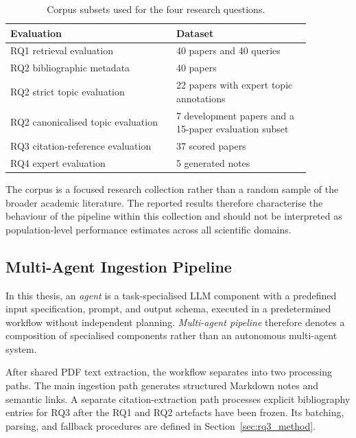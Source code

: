 \documentclass[runningheads]{llncs}
\begin{document}
\begin{table}[htbp]
    \centering
    \caption{Corpus subsets used for the four research questions.}
    \label{tab:evaluation_subsets}
    \begin{tabular}{p{0.48\linewidth} p{0.39\linewidth}}
        \toprule
        \textbf{Evaluation} & \textbf{Dataset} \\
        \midrule

        RQ1 retrieval evaluation
        & 40 papers and 40 queries \\

        RQ2 bibliographic metadata
        & 40 papers \\

        RQ2 strict topic evaluation
        & 22 papers with expert topic annotations \\

        RQ2 canonicalised topic evaluation
        & 7 development papers and a 15-paper evaluation subset \\

        RQ3 citation-reference evaluation
        & 37 scored papers \\

        RQ4 expert evaluation
        & 5 generated notes \\

        \bottomrule
    \end{tabular}
\end{table}

The corpus is a focused research collection rather than a random sample
of the broader academic literature. The reported results therefore
characterise the behaviour of the pipeline within this collection and
should not be interpreted as population-level performance estimates
across all scientific domains.

\subsection{Multi-Agent Ingestion Pipeline}
\label{sec:agent_pipeline}

In this thesis, an \emph{agent} is a task-specialised LLM component
with a predefined input specification, prompt, and output schema, executed in a
predetermined workflow without independent planning. \emph{Multi-agent
pipeline} therefore denotes a composition of specialised components
rather than an autonomous multi-agent system.

After shared PDF text extraction, the workflow separates into two
processing paths. The main ingestion path generates structured Markdown
notes and semantic links. A separate citation-extraction path processes
explicit bibliography entries for RQ3 after the RQ1 and RQ2 artefacts
have been frozen. Its batching, parsing, and fallback procedures are
defined in Section~\ref{sec:rq3_method}.
\end{document}
